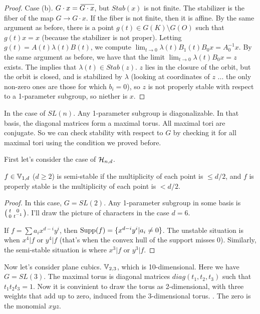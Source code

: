 \begin{proof}
 Case (b). $G\cdot x= \bbar{G\cdot x}$, but $Stab(x)$ is not finite. The stabilizer is the fiber of the map $G\to G\cdot x$. If the fiber is not finite, then it is affine. By the same argument as before, there is a point $g(t)\in G(K)\setminus G(O)$ such that $g(t)x=x$ (because the stabilizer is not proper). Letting $g(t)=A(t)\lambda(t)B(t)$, we compute $\lim_{t\to 0} \lambda(t)B_1(t)B_0x= A_0^{-1}x$. By the same argument as before, we have that the limit $\lim_{t\to 0}\lambda(t)B_0x=z$ exists. The implies that $\lambda(t)\in Stab(z)$. $z$ lies in the closure of the orbit, but the orbit is closed, and is stabilized by $\lambda$ (looking at coordinates of $z$ ... the only non-zero ones are those for which $b_i=0$), so $z$ is not properly stable with respect to a 1-parameter subgroup, so niether is $x$.
\end{proof}

In the case of $SL(n)$. Any 1-parameter subgroup is diagonalizable. In that basis, the diagonal matrices form a maximal torus. All maximal tori are conjugate. So we can check stability with respect to $G$ by checking it for all maximal tori using the condition we proved before.

First let's consider the case of $\mathcal{H}_{n,d}$.
\begin{proposition}
 $f\in \mathbb{V}_{1,d}$ ($d\ge 2$) is semi-stable if the multiplicity of each point is $\le d/2$, and $f$ is properly stable is the multiplicity of each point is $<d/2$.
\end{proposition}
\begin{proof}
 In this case, $G=SL(2)$. Any 1-parameter subgroup in some basis is $\bigl(\begin{smallmatrix} t&0\\ 0&t^{-1} \end{smallmatrix}\bigr)$. I'll draw the picture of characters in the case $d=6$. 
 
 If $f=\sum a_i x^{d-i}y^i$, then $\operatorname{Supp}(f)=\{x^{d-i}y^i|a_i\neq 0\}$. The unstable situation is when $x^4|f$ or $y^4|f$ (that's when the convex hull of the support misses 0). Similarly, the semi-stable situation is where $x^3|f$ or $y^3|f$.
\end{proof}
Now let's consider plane cubics. $\mathbb{V}_{2,3}$, which is 10-dimensional. Here we have $G=SL(3)$. The maximal torus is diagonal matrices $diag(t_1,t_2,t_3)$ such that $t_1t_2t_3=1$. Now it is convinient to draw the torus as 2-dimensional, with three weights that add up to zero, induced from the 3-dimensional torus. . The zero is the monomial $xyz$.

